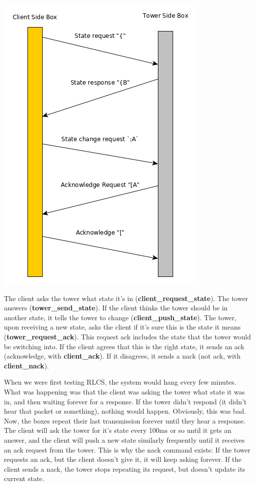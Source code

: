 \documentclass[11pt]{article}
\begin{document}
\begin{enumerate}
\begin{center}
\includegraphics[width=.9\linewidth]{./images/radio_state_change.png}
\end{center}


The client asks the tower what state it's in (\textbf{client\_request\_state}). The tower
answers (\textbf{tower\_send\_state}). If the client thinks the tower should be in
another state, it tells the tower to change (\textbf{client\_push\_state}). The tower,
upon receiving a new state, asks the client if it's sure this is the state it
means (\textbf{tower\_request\_ack}). This request ack includes the state that the tower
would be switching into. If the client agrees that this is the right state, it
sends an ack (acknowledge, with \textbf{client\_ack}). If it disagrees, it sends a nack
(not ack, with \textbf{client\_nack}).

When we were first testing RLCS, the system would hang every few minutes. What
was happening was that the client was asking the tower what state it was in, and
then waiting forever for a response. If the tower didn't respond (it didn't hear
that packet or something), nothing would happen. Obviously, this was bad. Now,
the boxes repeat their last transmission forever until they hear a response. The
client will ask the tower for it's state every 100ms or so until it gets an
answer, and the client will push a new state similarly frequently until it
receives an ack request from the tower. This is why the nack command exists: If
the tower requests an ack, but the client doesn't give it, it will keep asking
forever. If the client sends a nack, the tower stops repeating its request, but
doesn't update its current state.
\end{enumerate}
\end{document}
